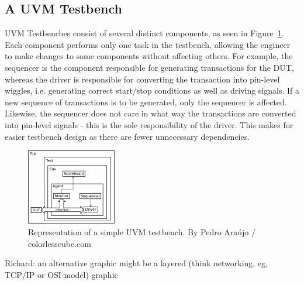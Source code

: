 \documentclass[conference]{IEEEtran}
\newcommand{\ducky}[1]{{\color{orange} Richard: #1}}
\begin{document}
\subsection{A UVM Testbench}
UVM Testbenches consist of several distinct components, as seen in Figure~\ref{fig:uvm_testbench}. Each component performs only one task in the testbench, allowing the engineer to make changes to some components without affecting others. 
For example, the sequencer is the component responsible for generating transactions for the DUT, whereas the driver is responsible for converting the transaction into pin-level wiggles, i.e. generating correct start/stop conditions as well as driving signals. If a new sequence of transactions is to be generated, only the sequencer is affected. Likewise, the sequencer does not care in what way the transactions are converted into pin-level signals - this is the sole responsibility of the driver. This makes for easier testbench design as there are fewer unnecessary dependencies. 

\begin{figure}
    \centering
    \includegraphics[width=0.35\textwidth]{uvm-tb_Pedro-Araujo.png}
    \caption{Representation of a simple UVM testbench. By Pedro Araújo / colorlesscube.com}
    \label{fig:uvm_testbench}
\end{figure}

\ducky{an alternative graphic might be a layered (think networking, eg, TCP/IP or OSI model) graphic}
\end{document}
